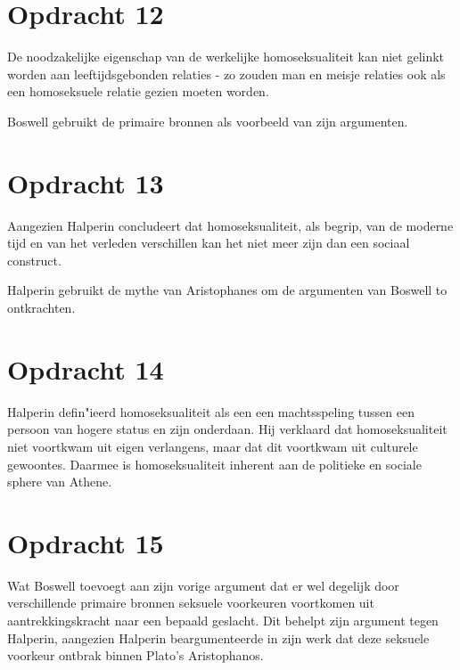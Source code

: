 \documentclass[10pt]{amsart}
\begin{document}
\section*{Opdracht 12}
De noodzakelijke eigenschap van de werkelijke homoseksualiteit kan niet gelinkt worden aan leeftijdsgebonden relaties - zo zouden man en meisje relaties ook als een homoseksuele relatie gezien moeten worden.

Boswell gebruikt de primaire bronnen als voorbeeld van zijn argumenten.

\section*{Opdracht 13}
Aangezien Halperin concludeert dat homoseksualiteit, als begrip, van de moderne tijd en van het verleden verschillen
kan het niet meer zijn dan een sociaal construct.

Halperin gebruikt de mythe van Aristophanes om de argumenten van Boswell to ontkrachten.

\section*{Opdracht 14}
Halperin \autocite{halperinThereHistorySexuality1989} defin"ieerd homoseksualiteit als een een machtsspeling tussen
een persoon van hogere status en zijn onderdaan. Hij verklaard dat homoseksualiteit niet voortkwam uit eigen
verlangens, maar dat dit voortkwam uit culturele gewoontes. Daarmee is homoseksualiteit inherent aan de politieke en sociale sphere van Athene.

\section*{Opdracht 15}
Wat Boswell\autocite{boswellConceptsExperienceSexuality1990} toevoegt aan zijn vorige argument dat er wel degelijk door verschillende
primaire bronnen seksuele voorkeuren voortkomen uit aantrekkingskracht naar een bepaald geslacht. Dit behelpt zijn argument tegen Halperin,
aangezien Halperin beargumenteerde in zijn werk dat deze seksuele voorkeur ontbrak binnen Plato's Aristophanos.
\end{document}
